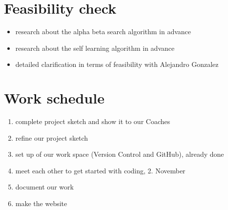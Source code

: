 \section{Feasibility check}
\begin{itemize}
    \item research about the alpha beta search algorithm in advance
    \item research about the self learning algorithm in advance
    \item detailed clarification in terms of feasibility with Alejandro Gonzalez
\end{itemize}

\section{Work schedule}
\begin{enumerate}
    \item complete project sketch and show it to our Coaches
    \item refine our project sketch
    \item set up of our work space (Version Control and GitHub), already done
    \item meet each other to get started with coding, 2. November
    \item document our work
    \item make the website
\end{enumerate}

